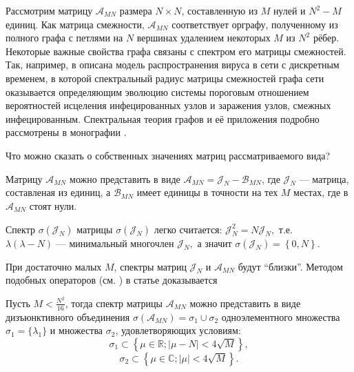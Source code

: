 Рассмотрим матрицу \( \mathscr{A}_{MN} \) размера \( N\times N \),
 составленную из \( M \) нулей и \( N^2 - M \) единиц.
Как матрица смежности, \( \mathscr{A}_{MN} \) соответствует орграфу,
 полученному из полного графа с петлями на \( N \) вершинах
 удалением некоторых \( M \) из \( N^2 \) рёбер.
Некоторые важные свойства графа связаны с спектром его матрицы смежностей.
Так, например, в \cite{epidemic} описана модель распространения вируса в сети
 с дискретным временем, в которой спектральный радиус матрицы смежностей графа сети
 оказывается определяющим эволюцию системы
 пороговым отношением вероятностей исцеления инфецированных узлов
 и заражения узлов, смежных инфецированным.
Спектральная теория графов и её приложения подробно рассмотрены
в монографии \cite{cvet}.

Что можно сказать о собственных значениях матриц рассматриваемого вида?

Матрицу \( \mathscr{A}_{MN} \) можно представить в виде
 \( \mathscr{A}_{MN} = \mathcal{J}_N - \mathscr{B}_{MN} \),
 где \( \mathcal{J}_N \) --- матрица, составленая из единиц,
 а \( \mathscr{B}_{MN} \) имеет единицы в точности на тех \( M \) местах,
 где в \( \mathscr{A}_{MN} \) стоят нули.

Спектр \( \sigma\left( \mathcal{J}_N \right) \)
 матрицы \( \sigma\left(\mathcal{J}_N\right) \) легко считается:
 \( \mathcal{J}_N^2 = N \mathcal{J}_N, \) т.е.
 \( \lambda(\lambda - N) \text{ --- минимальный многочлен } \mathcal{J}_N, \) а значит
 \( \sigma\left( \mathcal{J}_N \right) = \left\{ 0,N \right\}. \)

При достаточно малых \( M \),
 спектры матриц \( \mathcal{J}_N \) и \( \mathscr{A}_{MN} \) будут ``близки''.
Методом подобных операторов (см. \cite{baskakov-harmonic}\cite{baskakov-split})
 в статье доказывается
\begin{thm}
    Пусть \( M < \frac{N^2}{16} \),
    тогда спектр матрицы \( \mathscr{A}_{MN} \) можно представить в виде дизъюнктивного
    объединения \( \sigma\left(\mathscr{A}_{MN}\right) = \sigma_1 \cup \sigma_2 \)
    одноэлементного множества \( \sigma_1=\{\lambda_1\} \)
    и множества \( \sigma_2 \), удовлетворяющих условиям:
    \[ \sigma_1 \subset \left\{ \mu\in\mathbb{R}; \lvert \mu - N \rvert < 4\sqrt{M} \right\}, \]
    \[ \sigma_2 \subset \left\{ \mu\in\mathbb{C}; \lvert \mu \rvert < 4\sqrt{M} \right\}. \]
\end{thm}
